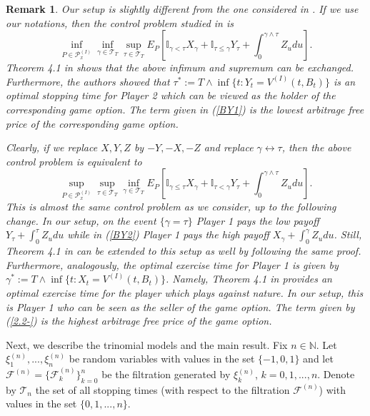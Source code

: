 \documentclass{amsart}
\newtheorem{rem}[thm]{Remark}
\numberwithin{equation}{section}
\begin{document}
\begin{rem}\label{rem2.1}
Our setup is slightly different from the one considered in \cite{BY}. If we use our notations,
then the control problem studied in \cite{BY}
is
\begin{equation}\label{BY1}
\inf_{P\in \mathcal{P}^{(I)}_x}\inf_{\gamma\in\mathcal T_{T}}\sup_{\tau\in\mathcal T_{T}}
E_P\left[\mathbb{I}_{\gamma<\tau}X_{\gamma}+\mathbb{I}_{\tau\leq\gamma}Y_{\tau}+\int_{0}^{\gamma\wedge\tau}Z_u du\right].
\end{equation}
Theorem 4.1 in \cite{BY} shows that the above infimum and supremum can be exchanged.
Furthermore, the authors showed that
 $\tau^{*}:=T\wedge\inf\{t: Y_t=V^{(I)}(t,B_t)\}$ is an optimal stopping time for Player 2
 which can be viewed as the holder of the corresponding game option. The term given
 in (\ref{BY1}) is the lowest arbitrage free price of the corresponding game option.

Clearly, if we replace $X,Y,Z$ by $-Y,-X,-Z$ and replace $\gamma\leftrightarrow\tau$, then
 the above control problem is equivalent to
 \begin{equation}\label{BY2}
 \sup_{P\in \mathcal{P}^{(I)}_x}\sup_{\tau\in\mathcal T_{T}}\inf_{\gamma\in\mathcal T_{T}}
E_P\left[\mathbb{I}_{\gamma\leq \tau}X_{\gamma}+\mathbb{I}_{\tau<\gamma}Y_{\tau}+\int_{0}^{\gamma\wedge\tau}Z_u du\right].
\end{equation}
This is almost the same control problem as we consider, up to the following change. In our setup, on the event
$\{\gamma=\tau\}$ Player 1 pays the low payoff $Y_{\tau}+\int_{0}^{\tau} Z_u du$
while in
(\ref{BY2}) Player 1 pays the high payoff $X_{\gamma}+\int_{0}^{\gamma} Z_u du$. Still,
Theorem 4.1 in \cite{BY} can be extended to this setup as well by following the same proof.
Furthermore, analogously,
the optimal exercise time for Player 1 is given by
$\gamma^{*}:=T\wedge\inf\{t: X_t=V^{(I)}(t,B_t)\}$. Namely, Theorem 4.1 in \cite{BY} provides an optimal exercise time for the player which plays against nature.
In our setup, this is Player 1 who can be seen as the seller of the game option.
The term given by (\ref{2.2-}) is the highest arbitrage free price of the game option.
\end{rem}

Next, we describe the trinomial models and the main result.
Fix $n\in\mathbb N$.
Let
$\xi^{(n)}_1,...,\xi^{(n)}_n$ be random variables with values in the set
$\{-1,0,1\}$ and let $\mathcal F^{(n)}=\{\mathcal F^{(n)}_k\}_{k=0}^n$ be the filtration
generated by $\xi^{(n)}_k$, $k=0,1,...,n$. Denote by $\mathcal T_n$ the set of all stopping times (with respect
to the filtration $\mathcal F^{(n)}$)
with values in
the set $\{0,1,...,n\}$.
\end{document}
